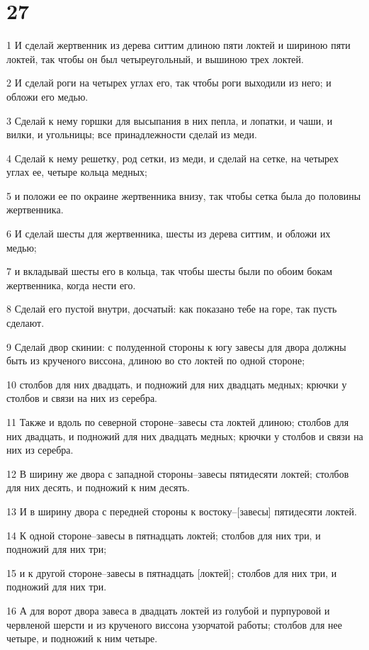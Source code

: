 \chapter{27}

\par 1 И сделай жертвенник из дерева ситтим длиною пяти локтей и шириною пяти локтей, так чтобы он был четыреугольный, и вышиною трех локтей.
\par 2 И сделай роги на четырех углах его, так чтобы роги выходили из него; и обложи его медью.
\par 3 Сделай к нему горшки для высыпания в них пепла, и лопатки, и чаши, и вилки, и угольницы; все принадлежности сделай из меди.
\par 4 Сделай к нему решетку, род сетки, из меди, и сделай на сетке, на четырех углах ее, четыре кольца медных;
\par 5 и положи ее по окраине жертвенника внизу, так чтобы сетка была до половины жертвенника.
\par 6 И сделай шесты для жертвенника, шесты из дерева ситтим, и обложи их медью;
\par 7 и вкладывай шесты его в кольца, так чтобы шесты были по обоим бокам жертвенника, когда нести его.
\par 8 Сделай его пустой внутри, досчатый: как показано тебе на горе, так пусть сделают.
\par 9 Сделай двор скинии: с полуденной стороны к югу завесы для двора должны быть из крученого виссона, длиною во сто локтей по одной стороне;
\par 10 столбов для них двадцать, и подножий для них двадцать медных; крючки у столбов и связи на них из серебра.
\par 11 Также и вдоль по северной стороне--завесы ста локтей длиною; столбов для них двадцать, и подножий для них двадцать медных; крючки у столбов и связи на них из серебра.
\par 12 В ширину же двора с западной стороны--завесы пятидесяти локтей; столбов для них десять, и подножий к ним десять.
\par 13 И в ширину двора с передней стороны к востоку--[завесы] пятидесяти локтей.
\par 14 К одной стороне--завесы в пятнадцать локтей; столбов для них три, и подножий для них три;
\par 15 и к другой стороне--завесы в пятнадцать [локтей]; столбов для них три, и подножий для них три.
\par 16 А для ворот двора завеса в двадцать локтей из голубой и пурпуровой и червленой шерсти и из крученого виссона узорчатой работы; столбов для нее четыре, и подножий к ним четыре.
